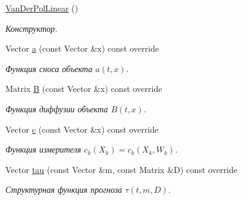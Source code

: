 \begin{DoxyCompactItemize}
\item 
\hypertarget{class_tasks_1_1_continuous_discrete_1_1_van_der_pol_linear_afc81c604c47749d5835cce42a7c490c7}{}\label{class_tasks_1_1_continuous_discrete_1_1_van_der_pol_linear_afc81c604c47749d5835cce42a7c490c7} 
\hyperlink{class_tasks_1_1_continuous_discrete_1_1_van_der_pol_linear_afc81c604c47749d5835cce42a7c490c7}{Van\+Der\+Pol\+Linear} ()
\begin{DoxyCompactList}\small\item\em Конструктор. \end{DoxyCompactList}\item 
\hypertarget{class_tasks_1_1_continuous_discrete_1_1_van_der_pol_linear_a4cddfa301760ccfb02ade1e597781af0}{}\label{class_tasks_1_1_continuous_discrete_1_1_van_der_pol_linear_a4cddfa301760ccfb02ade1e597781af0} 
Vector \hyperlink{class_tasks_1_1_continuous_discrete_1_1_van_der_pol_linear_a4cddfa301760ccfb02ade1e597781af0}{a} (const Vector \&x) const override
\begin{DoxyCompactList}\small\item\em Функция сноса объекта $a(t,x)$. \end{DoxyCompactList}\item 
\hypertarget{class_tasks_1_1_continuous_discrete_1_1_van_der_pol_linear_a45af3eac612e53628f0bc57920124a95}{}\label{class_tasks_1_1_continuous_discrete_1_1_van_der_pol_linear_a45af3eac612e53628f0bc57920124a95} 
Matrix \hyperlink{class_tasks_1_1_continuous_discrete_1_1_van_der_pol_linear_a45af3eac612e53628f0bc57920124a95}{B} (const Vector \&x) const override
\begin{DoxyCompactList}\small\item\em Функция диффузии объекта $B(t,x)$. \end{DoxyCompactList}\item 
Vector \hyperlink{class_tasks_1_1_continuous_discrete_1_1_van_der_pol_linear_af2602ff749602f29f5169ea0e1b391ed}{c} (const Vector \&x) const override
\begin{DoxyCompactList}\small\item\em Функция измерителя $c_k(X_k) = c_k(X_k, W_k)$. \end{DoxyCompactList}\item 
Vector \hyperlink{class_tasks_1_1_continuous_discrete_1_1_van_der_pol_linear_a5b9245d9f403e615a971f2e8009926e6}{tau} (const Vector \&m, const Matrix \&D) const override
\begin{DoxyCompactList}\small\item\em Структурная функция прогноза $\tau(t, m, D)$. \end{DoxyCompactList}\item 

\end{DoxyCompactItemize}
